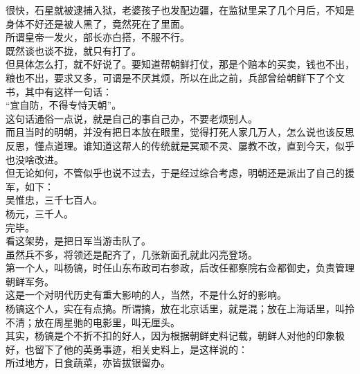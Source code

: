 \begin{multicols}{\theparacolNo}
很快，石星就被逮捕入狱，老婆孩子也发配边疆，在监狱里呆了几个月后，不知是身体不好还是被人黑了，竟然死在了里面。\\

所谓皇帝一发火，部长亦白搭，不服不行。\\

既然谈也谈不拢，就只有打了。\\

但具体怎么打，就不好说了。要知道帮朝鲜打仗，那是个赔本的买卖，钱也不出，粮也不出，要求又多，可谓是不厌其烦，所以在此之前，兵部曾给朝鲜下了个文书，其中有这样一句话：\\

“宜自防，不得专恃天朝”。\\

这句话通俗一点说，就是自己的事自己办，不要老烦别人。\\

而且当时的明朝，并没有把日本放在眼里，觉得打死人家几万人，怎么说也该反思反思，懂点道理。谁知道这帮人的传统就是冥顽不灵、屡教不改，直到今天，似乎也没啥改进。\\

但无论如何，不管似乎也说不过去，于是经过综合考虑，明朝还是派出了自己的援军，如下：\\

吴惟忠，三千七百人。\\

杨元，三千人。\\

完毕。\\

看这架势，是把日军当游击队了。\\

虽然兵不多，将领还是配齐了，几张新面孔就此闪亮登场。\\

第一个人，叫杨镐，时任山东布政司右参政，后改任都察院右佥都御史，负责管理朝鲜军务。\\

这是一个对明代历史有重大影响的人，当然，不是什么好的影响。\\

杨镐这个人，实在有点搞。所谓搞，放在北京话里，就是混；放在上海话里，叫拎不清；放在周星驰的电影里，叫无厘头。\\

其实，杨镐是个不折不扣的好人，因为根据朝鲜史料记载，朝鲜人对他的印象极好，也留下了他的英勇事迹，相关史料上，是这样说的：\\

所过地方，日食蔬菜，亦皆拔银留办。\\


\end{multicols}
